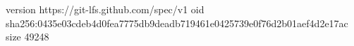 version https://git-lfs.github.com/spec/v1
oid sha256:0435e03cdeb4d0fea7775db9deadb719461e0425739e0f76d2b01aef4d2e17ac
size 49248
